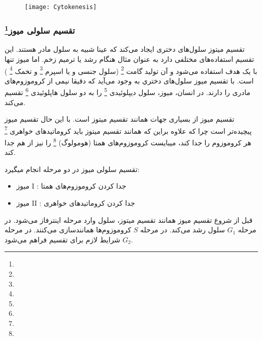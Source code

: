 \begin{figure}[h]
	\centering
	\texttt{[image: Cytokenesis]}
\end{figure}

\pagebreak
\subsubsection{تقسیم سلولی میوز\protect\footnote{}}

تقسیم میتوز سلول‌های دختری ایجاد می‌کند که عینا شبیه به سلول مادر هستند. این تقسیم استفاده‌های مختلفی دارد به عنوان مثال هنگام رشد یا ترمیم زخم. اما میوز تنها با یک هدف استفاده می‌شود و آن تولید گامت
\footnote{}
(سلول جنسی و یا اسپرم
\footnote{}
 و تخمک
 \footnote{}
 )
است. با تقسیم میوز سلول‌های دختري به وجود می‌آید که دقیقا نیمی از کروموزوم‌های مادری را دارند.
در انسان، میوز، سلول دیپلوئیدی
\footnote{}
را به دو سلول هاپلوئیدی
\footnote{}
تقسیم می‌کند.

تقسیم میوز از بسیاری جهات همانند تقسیم میتوز است. با این حال تقسیم میوز پیچیده‌تر است چرا که علاوه براین که همانند تقسیم میتوز باید کروماتید‌های خواهری
\footnote{}
هر کروموزوم را جدا کند، میبایست کروموزوم‌های همتا (هومولوگ)
\footnote{}
را نیز از هم جدا کند.

تقسیم سلولی میوز در دو مرحله انجام میگیرد:
\begin{itemize}
\item میوز
\RN{1}
:
جدا کردن کروموزوم‌های همتا
\item میوز
\RN{2}
:
جدا کردن کروماتید‌های خواهری
\end{itemize}

قبل از شروع تقسیم میوز همانند تقسیم میتوز، سلول وارد مرحله اینترفاز می‌شود. در مرحله
$ G_{1} $
سلول رشد می‌کند. در مرحله
$ S $
کروموزوم‌ها همانندسازی می‌کنند.
در مرحله
$ G_{2} $
شرایط لازم برای تقسیم فراهم می‌شود.


